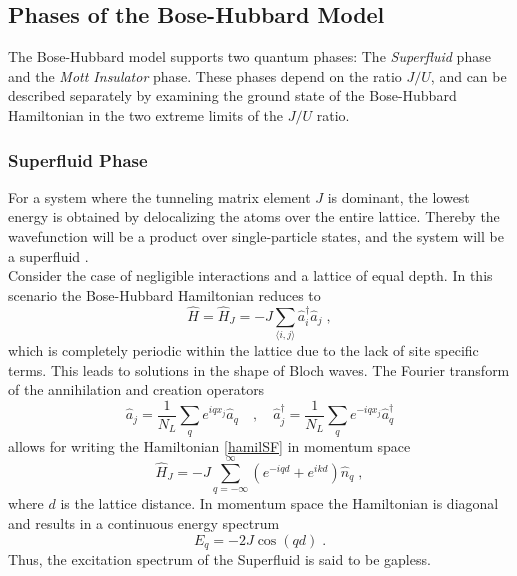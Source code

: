 \subsection{Phases of the Bose-Hubbard Model}

The Bose-Hubbard model supports two quantum phases: The \textit{Superfluid} phase and the \textit{Mott Insulator} phase. These phases depend on the ratio $J/U$, and can be described separately by examining the ground state of the Bose-Hubbard Hamiltonian in the two extreme limits of the $J/U$ ratio.

\subsubsection{Superfluid Phase}
For a system where the tunneling matrix element $J$ is dominant, the lowest energy is obtained by delocalizing the atoms over the entire lattice. Thereby the wavefunction will be a product over single-particle states, and the system will be a superfluid \cite{greiner}.\\
Consider the case of negligible interactions and a lattice of equal depth. In this scenario the Bose-Hubbard Hamiltonian reduces to
\begin{equation}
	\hat{H} = \hat{H}_J = - J \sum_{\langle i,j \rangle} \hat{a}_{i}^{\dag} \hat{a}_{j} \; , 
	\label{hamilSF}
\end{equation}
which is completely periodic within the lattice due to the lack of site specific terms. This leads to solutions in the shape of Bloch waves. The Fourier transform of the annihilation and creation operators
\begin{equation}
	\hat{a}_j = \frac{1}{N_L} \sum_{q}  e^{i q x_j} \hat{a}_q \quad , \quad
	\hat{a}_{j}^{\dag} = \frac{1}{N_L} \sum_{q}  e^{-i q x_j} \hat{a}_{q}^{\dag}
\end{equation}
allows for writing the Hamiltonian \eqref{hamilSF} in momentum space
\begin{equation}
	\hat{H}_J = - J \sum_{q = - \infty}^{\infty} \left( e^{- i q d } + e^{i k d} \right) \hat{n}_q \; ,
\end{equation}
where $d$ is the lattice distance. In momentum space the Hamiltonian is diagonal and results in a continuous energy spectrum
\begin{equation}
	E_q = -2 J \cos(q d) \; .
	\label{SFenergy}
\end{equation}
Thus, the excitation spectrum of the Superfluid is said to be gapless.

